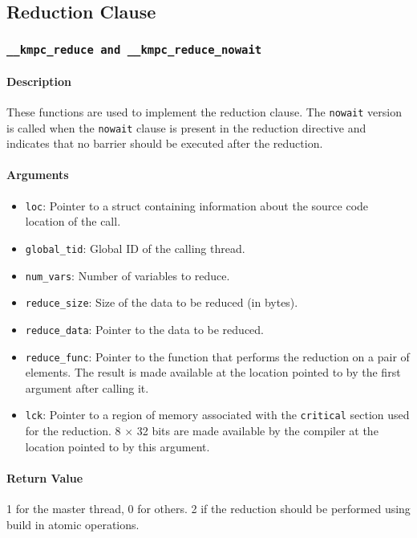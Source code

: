 \subsection{Reduction Clause}

\subsubsection{\texttt{__kmpc_reduce and __kmpc_reduce_nowait}}

\paragraph{Description} These functions are used to implement the reduction clause. The
\texttt{nowait} version is called when the \texttt{nowait} clause is present in the reduction
directive and indicates that no barrier should be executed after the reduction.

\paragraph{Arguments}
\begin{itemize}
	\item \texttt{loc}: Pointer to a struct containing information about the source code location
	      of the call.
	\item \texttt{global_tid}: Global ID of the calling thread.
	\item \texttt{num\_vars}: Number of variables to reduce.
	\item \texttt{reduce\_size}: Size of the data to be reduced (in bytes).
	\item \texttt{reduce\_data}: Pointer to the data to be reduced.
	\item \texttt{reduce\_func}: Pointer to the function that performs the reduction on a pair of
	      elements. The result is made available at the location pointed to by the first argument
	      after calling it.
	\item \texttt{lck}: Pointer to a region of memory associated with the \texttt{critical} section used for
	      the reduction. 8 $\times$ 32 bits are made available by the compiler at the location pointed
	      to by this argument.
\end{itemize}

\paragraph{Return Value} 1 for the master thread, 0 for others. 2 if the reduction should be
performed using build in atomic operations.

